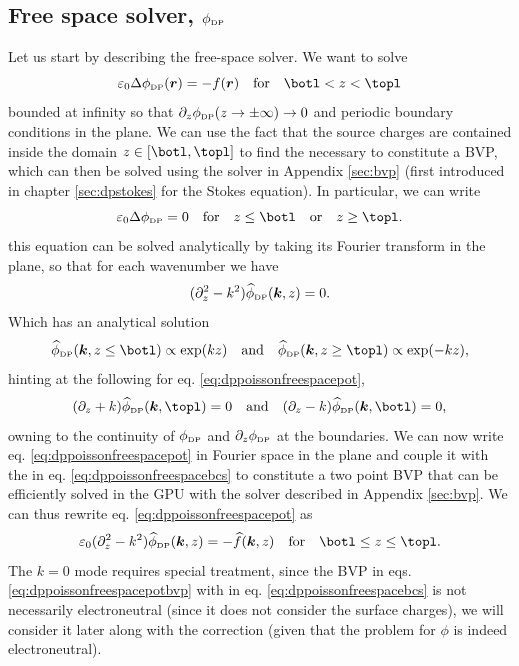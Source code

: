 \documentclass[ twoside,openright,titlepage,numbers=noenddot,%
headinclude,footinclude,cleardoublepage=empty,abstract=on,
BCOR=5mm,paper=a4,fontsize=11pt, dvipsnames
]{scrreprt}
\renewcommand{\vec}[1]{\bm{#1}}
\newcommand{\gpu}{\gls{GPU}\xspace}
\newcommand{\fou}[1]{\widehat{#1}}
\newcommand{\fpos}{r}
\newcommand{\dpr}{\text{\tiny DP}}
\begin{document}
\subsection{Free space solver, $\phi_{\dpr}$}\label{sec:dpsolver}
Let us start by describing the free-space solver. We want to solve
\begin{equation}
  \label{eq:dppoissonfreespacepot}
  \varepsilon_0 \Delta \phi_{\dpr}(\vec{\fpos}) = -f(\vec{\fpos}) \quad \text{for}\quad \botl<z<\topl
\end{equation}
bounded at infinity so that $\partial_z\phi_{\dpr}(z \rightarrow \pm \infty) \rightarrow 0$ and periodic boundary conditions in the plane.
We can use the fact that the source charges are contained inside the domain $z\in[\botl, \topl]$ to find the necessary \bcs to constitute a \gls{BVP}, which can then be solved using the solver in Appendix \ref{sec:bvp} (first introduced in chapter \ref{sec:dpstokes} for the Stokes equation). In particular, we can write
\begin{equation}
  \varepsilon_0 \Delta \phi_{\dpr} = 0\quad\text{for}\quad z\le\botl \quad\text{or}\quad z\ge \topl.
\end{equation}
this equation can be solved analytically by taking its Fourier transform in the plane, so that for each wavenumber we have
\begin{equation}
  (\partial_z^2 - k^2)\fou{\phi}_{\dpr}(\vec{k}, z) = 0.
\end{equation}
Which has an analytical solution
\begin{equation}
  \fou{\phi}_{\dpr}(\vec{k}, z \le \botl) \propto \exp(kz)\quad\text{and}\quad\fou{\phi}_{\dpr}(\vec{k}, z \ge \topl) \propto \exp(-kz),
\end{equation}
hinting at the following \bcs for eq. \eqref{eq:dppoissonfreespacepot},
\begin{equation}
  \label{eq:dppoissonfreespacebcs}
  (\partial_z + k)\fou{\phi}_{\dpr}(\vec{k}, \topl) = 0\quad\text{and}\quad(\partial_z - k)\fou{\phi}_{\dpr}(\vec{k}, \botl) = 0, 
\end{equation}
owning to the continuity of $\phi_{\dpr}$ and $\partial_z\phi_{\dpr}$ at the boundaries.
We can now write eq. \eqref{eq:dppoissonfreespacepot} in Fourier space in the plane and couple it with the \bcs in eq. \eqref{eq:dppoissonfreespacebcs} to constitute a two point \gls{BVP} that can be efficiently solved in the \gpu with the solver described in Appendix \ref{sec:bvp}. We can thus rewrite eq. \eqref{eq:dppoissonfreespacepot} as
\begin{equation}
  \label{eq:dppoissonfreespacepotbvp}
  \varepsilon_0(\partial_z^2 - k^2)\fou{\phi}_{\dpr}(\vec{k}, z) = -\fou{f}(\vec{k}, z) \quad \text{for}\quad \botl\le z\le \topl.
\end{equation}
The $k=0$ mode requires special treatment, since the \gls{BVP} in eqs. \eqref{eq:dppoissonfreespacepotbvp} with \bcs in eq. \eqref{eq:dppoissonfreespacebcs} is not necessarily electroneutral (since it does not consider the surface charges), we will consider it later along with the correction (given that the problem for $\phi$ is indeed electroneutral).
\end{document}

